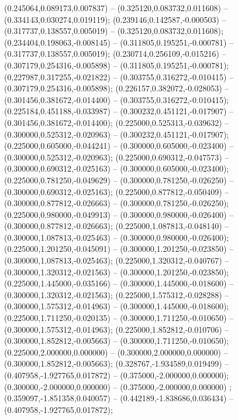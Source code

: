  (0.245064,0.089173,0.007837) -- (0.325120,0.083732,0.011608) -- (0.334143,0.030274,0.019119);
 (0.239146,0.142587,-0.000503) -- (0.317737,0.138557,0.005019) -- (0.325120,0.083732,0.011608);
 (0.234404,0.198063,-0.008145) -- (0.311805,0.195251,-0.000781) -- (0.317737,0.138557,0.005019);
 (0.230714,0.256109,-0.015216) -- (0.307179,0.254316,-0.005898) -- (0.311805,0.195251,-0.000781);
 (0.227987,0.317255,-0.021822) -- (0.303755,0.316272,-0.010415) -- (0.307179,0.254316,-0.005898);
 (0.226157,0.382072,-0.028053) -- (0.301456,0.381672,-0.014400) -- (0.303755,0.316272,-0.010415);
 (0.225184,0.451188,-0.033987) -- (0.300232,0.451121,-0.017907) -- (0.301456,0.381672,-0.014400);
 (0.225000,0.525313,-0.039632) -- (0.300000,0.525312,-0.020963) -- (0.300232,0.451121,-0.017907);
 (0.225000,0.605000,-0.044241) -- (0.300000,0.605000,-0.023400) -- (0.300000,0.525312,-0.020963);
 (0.225000,0.690312,-0.047573) -- (0.300000,0.690312,-0.025163) -- (0.300000,0.605000,-0.023400);
 (0.225000,0.781250,-0.049629) -- (0.300000,0.781250,-0.026250) -- (0.300000,0.690312,-0.025163);
 (0.225000,0.877812,-0.050409) -- (0.300000,0.877812,-0.026663) -- (0.300000,0.781250,-0.026250);
 (0.225000,0.980000,-0.049913) -- (0.300000,0.980000,-0.026400) -- (0.300000,0.877812,-0.026663);
 (0.225000,1.087813,-0.048140) -- (0.300000,1.087813,-0.025463) -- (0.300000,0.980000,-0.026400);
 (0.225000,1.201250,-0.045091) -- (0.300000,1.201250,-0.023850) -- (0.300000,1.087813,-0.025463);
 (0.225000,1.320312,-0.040767) -- (0.300000,1.320312,-0.021563) -- (0.300000,1.201250,-0.023850);
 (0.225000,1.445000,-0.035166) -- (0.300000,1.445000,-0.018600) -- (0.300000,1.320312,-0.021563);
 (0.225000,1.575312,-0.028288) -- (0.300000,1.575312,-0.014963) -- (0.300000,1.445000,-0.018600);
 (0.225000,1.711250,-0.020135) -- (0.300000,1.711250,-0.010650) -- (0.300000,1.575312,-0.014963);
 (0.225000,1.852812,-0.010706) -- (0.300000,1.852812,-0.005663) -- (0.300000,1.711250,-0.010650);
 (0.225000,2.000000,0.000000) -- (0.300000,2.000000,0.000000) -- (0.300000,1.852812,-0.005663);
 (0.328767,-1.934589,0.019499) -- (0.407958,-1.927765,0.017872) -- (0.375000,-2.000000,0.000000);
 (0.300000,-2.000000,0.000000) -- (0.375000,-2.000000,0.000000) ;
 (0.359097,-1.851358,0.040057) -- (0.442189,-1.838686,0.036434) -- (0.407958,-1.927765,0.017872);
